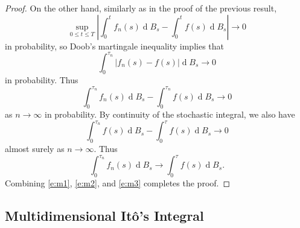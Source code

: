 \documentclass[11pt, a4paper]{memoir}
\theoremstyle{change}
\theoremstyle{plain}
\theoremstyle{nonumberplain}
\newtheorem{proof}{Proof}
\renewcommand{\d}[1]{\ensuremath{\operatorname{d}\!{#1}}}
\numberwithin{equation}{section}
\begin{document}
\begin{proof}
    On the other hand, similarly as in the proof of the previous result,
    \begin{equation*}
        \sup_{0\leq t\leq T}|\int_0^tf_n(s)\d{B_s}-\int_0^tf(s)\d{B_s}|\to 0
    \end{equation*}
    in probability, so Doob's martingale inequality implies that
    \begin{equation*}
        \int_0^{\tau_n}|f_n(s)-f(s)|\d{B_s}\to 0
    \end{equation*}
    in probability.
    Thus
    \begin{equation*}
        \int_0^{\tau_n}f_n(s)\d{B_s}-\int_0^{\tau_n}f(s)\d{B_s}\to 0
    \end{equation*}
    as $n\to\infty$ in probability.
    By continuity of the stochastic integral, we also have
    \begin{equation*}
        \int_0^{\tau_n}f(s)\d{B_s}-\int_0^\tau f(s)\d{B_s}\to 0
    \end{equation*}
    almost surely as $n\to\infty$.
    Thus
    \begin{equation}\label{e:m3}
        \int_0^{\tau_n}f_n(s)\d{B_s}\to\int_0^\tau f(s)\d{B_s}.
    \end{equation}
    Combining \cref{e:m1}, \cref{e:m2}, and \cref{e:m3} completes the proof.
\end{proof}
\subsection{Multidimensional Itô's Integral}
\end{document}
